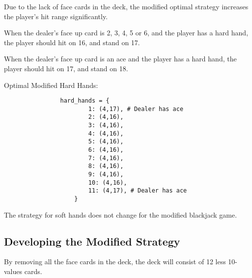 \documentclass{article}
\begin{document}
        Due to the lack of face cards in the deck, the modified optimal strategy increases the player's hit range significantly.
        
        \vspace{0.25cm} 
        
        \hspace{-0.55cm}When the dealer's face up card is 2, 3, 4, 5 or 6, and the player has a hard hand, the player should hit on 16, and stand on 17.

        \vspace{0.25cm} 

        \hspace{-0.55cm}When the dealer's face up card is an ace and the player has a hard hand, the player should hit on 17, and stand on 18.

        \vspace{0.5cm}
        
        \hspace{-0.55cm}Optimal Modified Hard Hands:
        \begin{verbatim}
                hard_hands = {
                        1: (4,17), # Dealer has ace
                        2: (4,16),
                        3: (4,16),
                        4: (4,16),
                        5: (4,16),
                        6: (4,16),
                        7: (4,16),
                        8: (4,16),
                        9: (4,16),
                        10: (4,16),
                        11: (4,17), # Dealer has ace
                    }
        \end{verbatim}

        \vspace{0.25cm}

        \hspace{-0.55cm}The strategy for soft hands does not change for the modified blackjack game. 

        \subsection{Developing the Modified Strategy}
	\label{Developing the Modified Strategy}

        By removing all the face cards in the deck, the deck will consist of 12 less 10-values cards. 

        \vspace{0.25cm}
        
\end{document}
